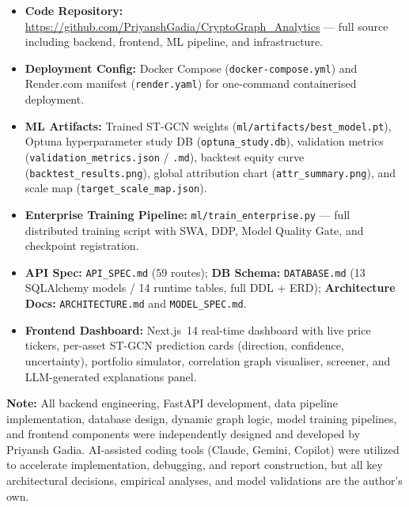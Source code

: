 \documentclass{article}
\begin{document}
\begin{itemize}[noitemsep]
  \item \textbf{Code Repository:} \url{https://github.com/PriyanshGadia/CryptoGraph_Analytics} --- full source including backend, frontend, ML pipeline, and infrastructure.
  \item \textbf{Deployment Config:} Docker Compose (\texttt{docker-compose.yml}) and Render.com manifest (\texttt{render.yaml}) for one-command containerised deployment.
  \item \textbf{ML Artifacts:} Trained ST-GCN weights (\texttt{ml/artifacts/best\_model.pt}), Optuna hyperparameter study DB (\texttt{optuna\_study.db}), validation metrics (\texttt{validation\_metrics.json} / \texttt{.md}), backtest equity curve (\texttt{backtest\_results.png}), global attribution chart (\texttt{attr\_summary.png}), and scale map (\texttt{target\_scale\_map.json}).
  \item \textbf{Enterprise Training Pipeline:} \texttt{ml/train\_enterprise.py} --- full distributed training script with SWA, DDP, Model Quality Gate, and checkpoint registration.
  \item \textbf{API Spec:} \texttt{API\_SPEC.md} (59 routes); \textbf{DB Schema:} \texttt{DATABASE.md} (13 SQLAlchemy models / 14 runtime tables, full DDL + ERD); \textbf{Architecture Docs:} \texttt{ARCHITECTURE.md} and \texttt{MODEL\_SPEC.md}.
  \item \textbf{Frontend Dashboard:} Next.js~14 real-time dashboard with live price tickers, per-asset ST-GCN prediction cards (direction, confidence, uncertainty), portfolio simulator, correlation graph visualiser, screener, and LLM-generated explanations panel.
\end{itemize}

\textbf{Note:} All backend engineering, FastAPI development, data pipeline implementation, database design, dynamic graph logic, model training pipelines, and frontend components were independently designed and developed by Priyansh Gadia. AI-assisted coding tools (Claude, Gemini, Copilot) were utilized to accelerate implementation, debugging, and report construction, but all key architectural decisions, empirical analyses, and model validations are the author's own.

\vfill\pagebreak

{\footnotesize

}
\end{document}
